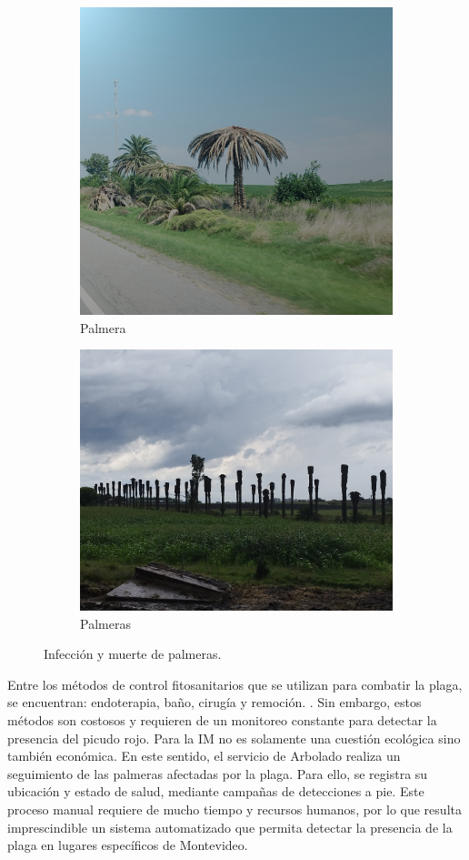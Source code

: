 \begin{figure}[!htpb]
  \centering
  \begin{subfigure}[a]{0.5\textwidth}
    \centering
    \includegraphics[width=.45\textwidth]{./Figures/palmera-infectada.jpg}
    \caption{Palmera } %
    \label{fig:palmera-infectada}
  \end{subfigure}
  \hfill
  \begin{subfigure}[b]{0.5\textwidth}
    \centering
    \includegraphics[width=.45\textwidth]{./Figures/palmeras-ruta5.jpg}
    \caption{Palmeras } %
    \label{fig:palmeras-ruta5}
  \end{subfigure}
  \caption{Infección y muerte de palmeras.}
  \label{fig:infeccion-y-muerte-palmeras}
\end{figure}





Entre los métodos de control fitosanitarios que se utilizan para combatir la plaga, se encuentran: endoterapia, baño, cirugía y remoción. . Sin embargo, estos métodos son costosos y requieren de un monitoreo constante para detectar la presencia del picudo rojo. Para la IM no es solamente una cuestión ecológica sino también económica. En este sentido, el servicio de Arbolado realiza un seguimiento de las palmeras afectadas por la plaga. Para ello, se registra su ubicación y estado de salud, mediante campañas de detecciones a pie. Este proceso manual requiere de mucho tiempo y recursos humanos, por lo que resulta imprescindible un sistema automatizado que permita detectar la presencia de la plaga en lugares específicos de Montevideo.


